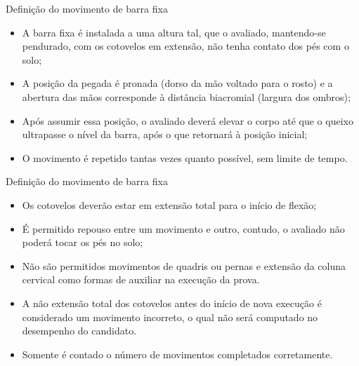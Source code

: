 
\begin{frame}{Definição do movimento de barra fixa}
    \begin{itemize}
        \item A barra fixa é instalada a uma altura tal, que o avaliado, mantendo-se pendurado, com os cotovelos em extensão, não tenha contato dos pés com o solo;
        \item  A posição da pegada é pronada (dorso da mão voltado para o rosto) e a abertura das mãos corresponde à distância biacromial (largura dos ombros); 
        \item  Após assumir essa posição, o avaliado deverá elevar o corpo até que o queixo ultrapasse o nível da barra, após o que retornará à posição inicial; 
        \item  O movimento é repetido tantas vezes quanto possível, sem limite de tempo. 
    \end{itemize}
\end{frame}

\begin{frame}{Definição do movimento de barra fixa}
    \begin{itemize}
        \item  Os cotovelos deverão estar em extensão total para o início de flexão; 
        \item  É permitido repouso entre um movimento e outro, contudo, o avaliado não poderá tocar os pés no solo; 
        \item  Não são permitidos movimentos de quadris ou pernas e extensão da coluna cervical como formas de auxiliar na execução da prova. 
        \item  A não extensão total dos cotovelos antes do início de nova execução é considerado um movimento incorreto, o qual não será computado no desempenho do candidato. 
        \item  Somente é contado o número de movimentos completados corretamente.
    \end{itemize}
\end{frame}


